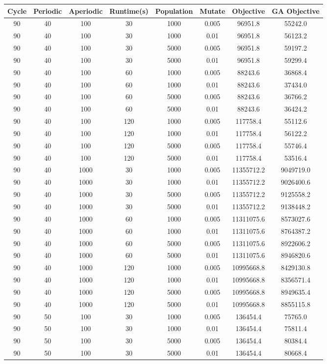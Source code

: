 \documentclass[a4paper,12pt]{article}
\begin{document}
\begin{tabular}{|c|c|c|c|c|c|c|c|}
\hline
Cycle&Periodic&Aperiodic&Runtime(s)&Population&Mutate&Objective&GA Objective\\
\hline
90&40&100&30&1000&0.005&96951.8&55242.0\\
\hline
90&40&100&30&1000&0.01&96951.8&56123.2\\
\hline
90&40&100&30&5000&0.005&96951.8&59197.2\\
\hline
90&40&100&30&5000&0.01&96951.8&59299.4\\
\hline
90&40&100&60&1000&0.005&88243.6&36868.4\\
\hline
90&40&100&60&1000&0.01&88243.6&37434.0\\
\hline
90&40&100&60&5000&0.005&88243.6&36766.2\\
\hline
90&40&100&60&5000&0.01&88243.6&36424.2\\
\hline
90&40&100&120&1000&0.005&117758.4&55112.6\\
\hline
90&40&100&120&1000&0.01&117758.4&56122.2\\
\hline
90&40&100&120&5000&0.005&117758.4&55746.4\\
\hline
90&40&100&120&5000&0.01&117758.4&53516.4\\
\hline
90&40&1000&30&1000&0.005&11355712.2&9049719.0\\
\hline
90&40&1000&30&1000&0.01&11355712.2&9026400.6\\
\hline
90&40&1000&30&5000&0.005&11355712.2&9125558.2\\
\hline
90&40&1000&30&5000&0.01&11355712.2&9138448.2\\
\hline
90&40&1000&60&1000&0.005&11311075.6&8573027.6\\
\hline
90&40&1000&60&1000&0.01&11311075.6&8764387.2\\
\hline
90&40&1000&60&5000&0.005&11311075.6&8922606.2\\
\hline
90&40&1000&60&5000&0.01&11311075.6&8946820.6\\
\hline
90&40&1000&120&1000&0.005&10995668.8&8429130.8\\
\hline
90&40&1000&120&1000&0.01&10995668.8&8356571.4\\
\hline
90&40&1000&120&5000&0.005&10995668.8&8949635.4\\
\hline
90&40&1000&120&5000&0.01&10995668.8&8855115.8\\
\hline
90&50&100&30&1000&0.005&136454.4&75765.0\\
\hline
90&50&100&30&1000&0.01&136454.4&75811.4\\
\hline
90&50&100&30&5000&0.005&136454.4&80384.4\\
\hline
90&50&100&30&5000&0.01&136454.4&80668.4\\
\hline
\end{tabular}
\end{document}
